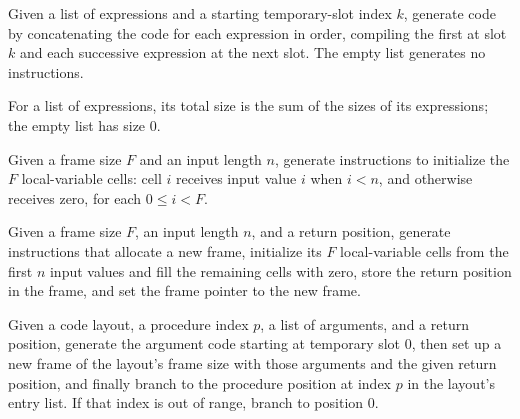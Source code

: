 \begin{definition}
\label{Light.Compiler.argsCode}
\leanok
{}
Given a list of expressions and a starting temporary-slot index $k$, generate code by
concatenating the code for each expression in order, compiling the first at slot $k$ and
each successive expression at the next slot. The empty list generates no instructions.
\end{definition}

\begin{definition}
\label{Light.Compiler.argsSize}
\leanok
{}
For a list of expressions, its total size is the sum of the sizes of its expressions;
the empty list has size $0$.
\end{definition}

\begin{definition}
\label{Light.Compiler.frameInit}
\leanok
{}
Given a frame size $F$ and an input length $n$, generate instructions to initialize the
$F$ local-variable cells: cell $i$ receives input value $i$ when $i<n$, and otherwise
receives zero, for each $0\le i<F$.
\end{definition}

\begin{definition}
\label{Light.Compiler.newFrame}
\leanok
{}
Given a frame size $F$, an input length $n$, and a return position, generate
instructions that allocate a new frame, initialize its $F$ local-variable cells from the
first $n$ input values and fill the remaining cells with zero, store the return position
in the frame, and set the frame pointer to the new frame.
\end{definition}

\begin{definition}
\label{Light.Compiler.callCode}
\leanok
{}
Given a code layout, a procedure index $p$, a list of arguments, and a return position,
generate the argument code starting at temporary slot $0$, then set up a new frame of
the layout’s frame size with those arguments and the given return position, and finally
branch to the procedure position at index $p$ in the layout’s entry list. If that index
is out of range, branch to position $0$.
\end{definition}

